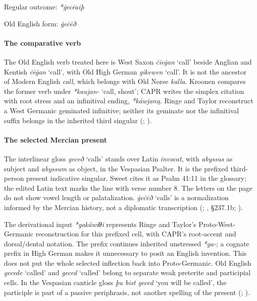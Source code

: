 \documentclass[
  british,
  a4paper,
]{article}
\providecommand{\Recon}[1]{\emph{*#1}}
\begin{document}
Regular outcome: \Recon{ġecēaiþ}

Old English form: \emph{ġeċēð}

\paragraph{The comparative verb}\label{the-comparative-verb}

The Old English verb treated here is West Saxon \emph{ċīeġan} `call'
beside Anglian and Kentish \emph{ċēġan} `call', with Old High German
\emph{gikewen} `call'. It is not the ancestor of Modern English
\emph{call}, which belongs with Old Norse \emph{kalla}. Kroonen compares
the former verb under \Recon{kaujan-} `call, shout'; CAPR writes the
simplex citation with root stress and an infinitival ending,
\emph{*káwjaną}. Ringe and Taylor reconstruct a West Germanic geminated
infinitive; neither its geminate nor the infinitival suffix belongs in
the inherited third singular (; ).

\paragraph{The selected Mercian
present}\label{the-selected-mercian-present}

The interlinear gloss {\emph{geceð}} `calls' stands over Latin
\emph{invocat}, with \emph{abyssus} as subject and \emph{abyssum} as
object, in the Vespasian Psalter. It is the prefixed third-person
present indicative singular. Sweet cites it as Psalm 41:11 in the
glossary; the edited Latin text marks the line with verse number 8. The
letters on the page do not show vowel length or palatalization.
{\emph{ġeċēð}} `calls' is a normalization informed by the Mercian
history, not a diplomatic transcription (; ,
§237.1b; ).

The derivational input \emph{*gakáwiθi} represents Ringe and Taylor's
Proto-West-Germanic reconstruction for this prefixed cell, with CAPR's
root-accent and dorsal/dental notation. The prefix continues inherited
unstressed \emph{*ga-}; a cognate prefix in High German makes it
unnecessary to posit an English invention. This does not put the whole
selected inflection back into Proto-Germanic. Old English \emph{gecede}
`called' and \emph{geced} `called' belong to separate weak preterite and
participial cells. In the Vespasian canticle gloss \emph{þu bist geced}
`you will be called', the participle is part of a passive periphrasis,
not another spelling of the present (; ).
\end{document}
